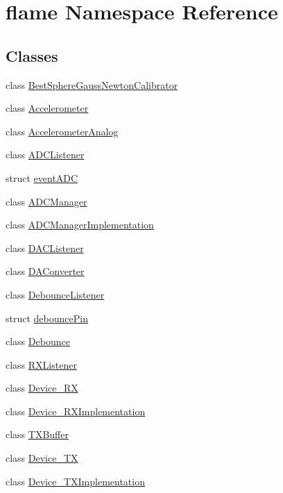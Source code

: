 \hypertarget{namespaceflame}{\section{flame Namespace Reference}
\label{namespaceflame}
}
\subsection*{Classes}
\begin{DoxyCompactItemize}
\item 
class \hyperlink{classflame_1_1_best_sphere_gauss_newton_calibrator}{Best\-Sphere\-Gauss\-Newton\-Calibrator}
\item 
class \hyperlink{classflame_1_1_accelerometer}{Accelerometer}
\item 
class \hyperlink{classflame_1_1_accelerometer_analog}{Accelerometer\-Analog}
\item 
class \hyperlink{classflame_1_1_a_d_c_listener}{A\-D\-C\-Listener}
\item 
struct \hyperlink{structflame_1_1event_a_d_c}{event\-A\-D\-C}
\item 
class \hyperlink{classflame_1_1_a_d_c_manager}{A\-D\-C\-Manager}
\item 
class \hyperlink{classflame_1_1_a_d_c_manager_implementation}{A\-D\-C\-Manager\-Implementation}
\item 
class \hyperlink{classflame_1_1_d_a_c_listener}{D\-A\-C\-Listener}
\item 
class \hyperlink{classflame_1_1_d_a_converter}{D\-A\-Converter}
\item 
class \hyperlink{classflame_1_1_debounce_listener}{Debounce\-Listener}
\item 
struct \hyperlink{structflame_1_1debounce_pin}{debounce\-Pin}
\item 
class \hyperlink{classflame_1_1_debounce}{Debounce}
\item 
class \hyperlink{classflame_1_1_r_x_listener}{R\-X\-Listener}
\item 
class \hyperlink{classflame_1_1_device___r_x}{Device\-\_\-\-R\-X}
\item 
class \hyperlink{classflame_1_1_device___r_x_implementation}{Device\-\_\-\-R\-X\-Implementation}
\item 
class \hyperlink{classflame_1_1_t_x_buffer}{T\-X\-Buffer}
\item 
class \hyperlink{classflame_1_1_device___t_x}{Device\-\_\-\-T\-X}
\item 
class \hyperlink{classflame_1_1_device___t_x_implementation}{Device\-\_\-\-T\-X\-Implementation}

\end{DoxyCompactItemize}
